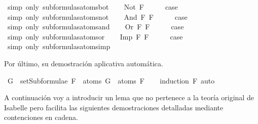 \begin{isabellebody}
\ {\isacharparenleft}simp\ only{\isacharcolon}\ subformulas{\isacharunderscore}atoms{\isacharunderscore}bot{\isacharparenright}\isanewline
{}\isamarkupfalse%
\isanewline
\ \ \isamarkupfalse%
\ {\isacharparenleft}Not\ F{\isacharparenright}\isanewline
\ \ \isamarkupfalse%
\ \isamarkupfalse%
\ {\isacharquery}case\ \isamarkupfalse%
\ {\isacharparenleft}simp\ only{\isacharcolon}\ subformulas{\isacharunderscore}atoms{\isacharunderscore}not{\isacharparenright}\isanewline
{}\isamarkupfalse%
\isanewline
\ \ \isamarkupfalse%
\ {\isacharparenleft}And\ F{}\ F{}{\isacharparenright}\isanewline
\ \ \isamarkupfalse%
\ \isamarkupfalse%
\ {\isacharquery}case\ \isamarkupfalse%
\ {\isacharparenleft}simp\ only{\isacharcolon}\ subformulas{\isacharunderscore}atoms{\isacharunderscore}and{\isacharparenright}\isanewline
{}\isamarkupfalse%
\isanewline
\ \ \isamarkupfalse%
\ {\isacharparenleft}Or\ F{}\ F{}{\isacharparenright}\isanewline
\ \ \isamarkupfalse%
\ \isamarkupfalse%
\ {\isacharquery}case\ \isamarkupfalse%
\ {\isacharparenleft}simp\ only{\isacharcolon}\ subformulas{\isacharunderscore}atoms{\isacharunderscore}or{\isacharparenright}\isanewline
{}\isamarkupfalse%
\isanewline
\ \ \isamarkupfalse%
\ {\isacharparenleft}Imp\ F{}\ F{}{\isacharparenright}\isanewline
\ \ \isamarkupfalse%
\ \isamarkupfalse%
\ {\isacharquery}case\ \isamarkupfalse%
\ {\isacharparenleft}simp\ only{\isacharcolon}\ subformulas{\isacharunderscore}atoms{\isacharunderscore}imp{\isacharparenright}\isanewline
{}\isamarkupfalse%
%
\endisatagproof
{\isafoldproof}%
%
\isadelimproof
%
\endisadelimproof
%
\begin{isamarkuptext}%
Por último, su demostración aplicativa automática.%
\end{isamarkuptext}\isamarkuptrue%
\isamarkupfalse%
\ {\isachardoublequoteopen}G\ {\isasymin}\ setSubformulae\ F\ {\isasymLongrightarrow}\ atoms\ G\ {\isasymsubseteq}\ atoms\ F{\isachardoublequoteclose}\isanewline
%
\isadelimproof
\ \ %
\endisadelimproof
%
\isatagproof
{}\isamarkupfalse%
\ {\isacharparenleft}induction\ F{\isacharparenright}\ auto%
\endisatagproof
{\isafoldproof}%
%
\isadelimproof
%
\endisadelimproof
%
\begin{isamarkuptext}%
%
\end{isamarkuptext}\isamarkuptrue%
%
\begin{isamarkuptext}%
A continuación voy a introducir un lema que no pertenece a la 
  teoría original de Isabelle pero facilita las siguientes 
  demostraciones detalladas mediante contenciones en cadena.


\end{isamarkuptext}
\end{isabellebody}
